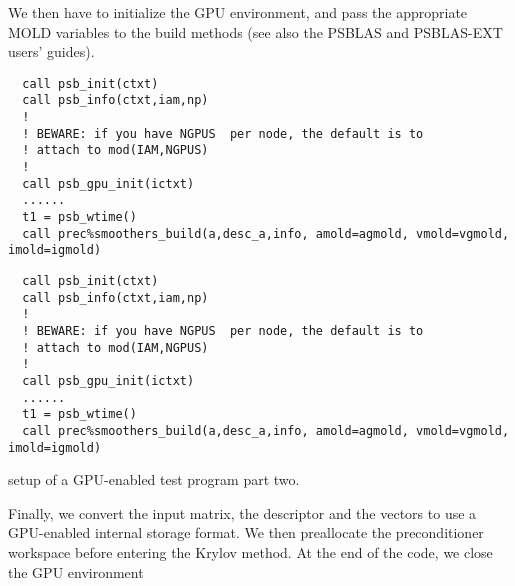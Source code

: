 We then have to initialize the GPU environment, and pass the
appropriate MOLD variables to the build methods (see also the PSBLAS
and PSBLAS-EXT users' guides).
\begin{listing}[h!]
\ifpdf
\begin{verbatim}
  call psb_init(ctxt)
  call psb_info(ctxt,iam,np)
  !
  ! BEWARE: if you have NGPUS  per node, the default is to
  ! attach to mod(IAM,NGPUS)
  !
  call psb_gpu_init(ictxt)
  ......
  t1 = psb_wtime()
  call prec%smoothers_build(a,desc_a,info, amold=agmold, vmold=vgmold, imold=igmold)

\end{verbatim}
\else
\begin{center}
\begin{minipage}{.90\textwidth}
{\small
\begin{verbatim}
  call psb_init(ctxt)
  call psb_info(ctxt,iam,np)
  !
  ! BEWARE: if you have NGPUS  per node, the default is to
  ! attach to mod(IAM,NGPUS)
  !
  call psb_gpu_init(ictxt)
  ......
  t1 = psb_wtime()
  call prec%smoothers_build(a,desc_a,info, amold=agmold, vmold=vgmold, imold=igmold)

 \end{verbatim}
}
\end{minipage}
\end{center}
\fi
\caption{setup of a GPU-enabled test program part two.\label{fig:gpu-ex2}}
\end{listing}
Finally, we convert the input matrix, the descriptor and the vectors
to use a GPU-enabled internal storage format. 
We then preallocate the preconditioner workspace before entering the
Krylov method. At the end of the code, we close the GPU environment 
